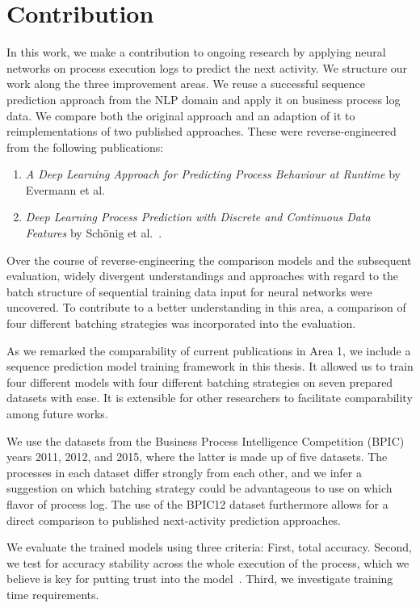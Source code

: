\section{Contribution}\label{sec:intro:contribution}
In this work, we make a contribution to ongoing research by applying neural networks on process execution logs to predict the next activity. We structure our work along the three improvement areas. We reuse a successful sequence prediction approach from the NLP domain and apply it on business process log data. We compare both the original approach and an adaption of it to reimplementations of two published approaches. These were reverse-engineered from the following publications:

\begin{enumerate}
    \item\textit{A Deep Learning Approach for Predicting Process Behaviour at Runtime} by Evermann et al.~\cite{evermann2016}
    \item\textit{Deep Learning Process Prediction with Discrete and Continuous Data Features} by Schönig et al.~\cite{schoenig2018}.
\end{enumerate}

Over the course of reverse-engineering the comparison models and the subsequent evaluation, widely divergent understandings and approaches with regard to the batch structure of sequential training data input for neural networks were uncovered. To contribute to a better understanding in this area, a comparison of four different batching strategies was incorporated into the evaluation.

As we remarked the comparability of current publications in Area 1, we include a sequence prediction model training framework in this thesis. It allowed us to train four different models with four different batching strategies on seven prepared datasets with ease. It is extensible for other researchers to facilitate comparability among future works.

We use the datasets from the Business Process Intelligence Competition (BPIC) years 2011, 2012, and 2015, where the latter is made up of five datasets. The processes in each dataset differ strongly from each other, and we infer a suggestion on which batching strategy could be advantageous to use on which flavor of process log. The use of the BPIC12 dataset furthermore allows for a direct comparison to published next-activity prediction approaches.

We evaluate the trained models using three criteria: First, total accuracy. Second, we test for accuracy stability across the whole execution of the process, which we believe is key for putting trust into the model~\cite{francescomarino2015, boehmer2018probability}. Third, we investigate training time requirements.

